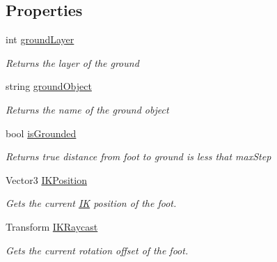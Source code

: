 \subsection*{Properties}
\begin{DoxyCompactItemize}
\item 
int \mbox{\hyperlink{class_root_motion_1_1_final_i_k_1_1_grounding_1_1_leg_a45c4cee3a938d21de74f9c09cc5d5dd1}{ground\+Layer}}
\begin{DoxyCompactList}\small\item\em Returns the layer of the ground \end{DoxyCompactList}\item 
string \mbox{\hyperlink{class_root_motion_1_1_final_i_k_1_1_grounding_1_1_leg_a64ba8549b7edcd3881d80d6321489d6e}{ground\+Object}}
\begin{DoxyCompactList}\small\item\em Returns the name of the ground object \end{DoxyCompactList}\item 
bool \mbox{\hyperlink{class_root_motion_1_1_final_i_k_1_1_grounding_1_1_leg_adf9cfd1510700a78b2d85ed3863c0667}{is\+Grounded}}
\begin{DoxyCompactList}\small\item\em Returns true distance from foot to ground is less that max\+Step \end{DoxyCompactList}\item 
Vector3 \mbox{\hyperlink{class_root_motion_1_1_final_i_k_1_1_grounding_1_1_leg_aef75780e0132d7035dddd22c521fbef8}{I\+K\+Position}}
\begin{DoxyCompactList}\small\item\em Gets the current \mbox{\hyperlink{class_root_motion_1_1_final_i_k_1_1_i_k}{IK}} position of the foot. \end{DoxyCompactList}\item 
Transform \mbox{\hyperlink{class_root_motion_1_1_final_i_k_1_1_grounding_1_1_leg_a9ef125796ced2a4466153220194667aa}{I\+K\+Raycast}}
\begin{DoxyCompactList}\small\item\em Gets the current rotation offset of the foot. \end{DoxyCompactList}\item 

\end{DoxyCompactItemize}
